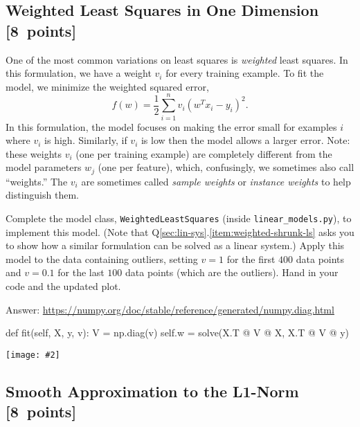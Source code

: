 \documentclass{article}
\newcommand{\blu}[1]{{\textcolor{blu}{#1}}}
\newenvironment{answer}{\par\begingroup\color{gre}Answer: }{\endgroup}
\let\ask\blu
\newcommand\pts[1]{\textcolor{pointscolour}{[#1~points]}}
\newcommand{\centerfig}[2]{\begin{center}\texttt{[image: \#2]}\end{center}}
\begin{document}
\subsection{Weighted Least Squares in One Dimension \pts{8}}

One of the most common variations on least squares is \emph{weighted} least squares. In this formulation, we have a weight $v_i$ for every training example. To fit the model, we minimize the weighted squared error,
\[
f(w) =  \frac{1}{2}\sum_{i=1}^n v_i(w^Tx_i - y_i)^2.
\]
In this formulation, the model focuses on making the error small for examples $i$ where $v_i$ is high. Similarly, if $v_i$ is low then the model allows a larger error. Note: these weights $v_i$ (one per training example) are completely different from the model parameters $w_j$ (one per feature), which, confusingly, we sometimes also call ``weights.'' The $v_i$ are sometimes called \emph{sample weights} or \emph{instance weights} to help distinguish them.

Complete the model class, \texttt{WeightedLeastSquares} (inside \texttt{linear\_models.py}), to implement this model.
(Note that Q\ref{sec:lin-sys}.\ref{item:weighted-shrunk-ls} asks you to show how a similar formulation can be solved as a linear system.)
Apply this model to the data containing outliers, setting $v = 1$ for the first
$400$ data points and $v = 0.1$ for the last $100$ data points (which are the outliers).
\ask{Hand in your code and the updated plot}.

\begin{answer}
    \url{https://numpy.org/doc/stable/reference/generated/numpy.diag.html}
\end{answer}
\begin{python}
def fit(self, X, y, v):
    V = np.diag(v)
    self.w = solve(X.T @ V @ X, X.T @ V @ y)
    \end{python}
    \centerfig{.7}{./figs/weighted_least_squares.pdf}

\subsection{Smooth Approximation to the L1-Norm \pts{8}}
\end{document}
